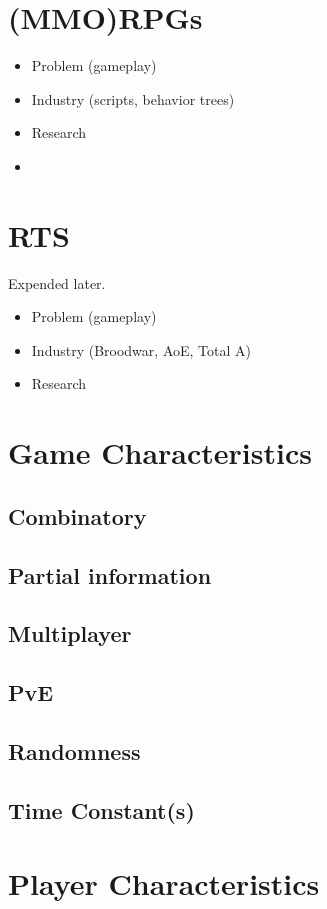 \section{(MMO)RPGs}
\begin{itemize}
\item Problem (gameplay)
\item Industry (scripts, behavior trees)
\item Research \citep{Cutumisu09}
\item \citep{SYNNAEVE:MMORPG}
\end{itemize}

\section{RTS}
Expended later.
\begin{itemize}
\item Problem (gameplay)
\item Industry (Broodwar, AoE, Total A)
\item Research
\end{itemize}

\section{Game Characteristics}
\subsection{Combinatory}
\subsection{Partial information}
\subsection{Multiplayer}
\subsection{PvE}
\subsection{Randomness}
\subsection{Time Constant(s)}

\section{Player Characteristics}
